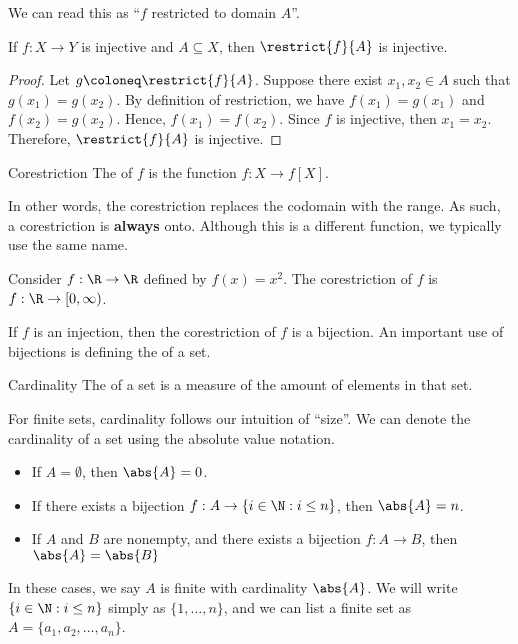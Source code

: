 \documentclass[letterpaper,12pt]{report}
\begin{document}
We can read this as ``$f$ restricted to domain $A$''.

\begin{exbox}{}{}
    If $f : X \to Y$ is injective and $A \subseteq X$, then $\restrict{f}{A}$ is injective.
    \tcblower
    \begin{proof}
        Let $g \coloneq \restrict{f}{A}$. Suppose there exist $x_1, x_2 \in A$ such that $g(x_1) = g(x_2)$. By definition of restriction, we have $f(x_1) = g(x_1)$ and $f(x_2) = g(x_2)$. Hence, $f(x_1) = f(x_2)$. Since $f$ is injective, then $x_1 = x_2$. Therefore, $\restrict{f}{A}$ is injective.
    \end{proof}
\end{exbox}

\begin{dfnbox}{Corestriction}{}
    The  of $f$ is the function $f : X \to f[X]$.
\end{dfnbox}

In other words, the corestriction replaces the codomain with the range. As such, a corestriction is \textbf{always} onto. Although this is a different function, we typically use the same name.

\begin{exbox}{}{}
    Consider $f : \R \to \R$ defined by $f(x) = x^2$. The corestriction of $f$ is $f : \R \to [0, \infty)$.
\end{exbox}

If $f$ is an injection, then the corestriction of $f$ is a bijection. An important use of bijections is defining the  of a set.

\begin{dfnbox}{Cardinality}{}
    The  of a set is a measure of the amount of elements in that set.
\end{dfnbox}
For finite sets, cardinality follows our intuition of ``size''. We can denote the cardinality of a set using the absolute value notation.
\begin{itemize}
    \item If $A = \emptyset$, then $\abs{A} = 0$.
    \item If there exists a bijection $f : A \to \{i \in \N : i \leq n \}$, then $\abs{A} = n$.
    \item If $A$ and $B$ are nonempty, and there exists a bijection $f : A \to B$, then $\abs{A} = \abs{B}$
\end{itemize}

In these cases, we say $A$ is finite with cardinality $\abs{A}$. We will write $\{i \in \N : i \leq n \}$ simply as $\{1, \ldots, n\}$, and we can list a finite set as $A = \{a_1, a_2, \ldots, a_n\}$.
\end{document}
